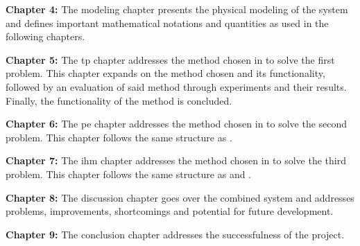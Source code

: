 \textbf{Chapter 4:} The modeling chapter presents the physical modeling of the system and defines important mathematical notations and quantities as used in the following chapters. \medskip

\textbf{Chapter 5:} The \gls{tp} chapter addresses the method chosen in  to solve the first problem. This chapter expands on the method chosen and its functionality, followed by an evaluation of said method through experiments and their results. Finally, the functionality of the method is concluded. \medskip

\textbf{Chapter 6:} The \gls{pe} chapter addresses the method chosen in  to solve the second problem. This chapter follows the same structure as . \medskip

\textbf{Chapter 7:} The \gls{ihm} chapter addresses the method chosen in  to solve the third problem. This chapter follows the same structure as  and . \medskip

\textbf{Chapter 8:} The discussion chapter goes over the combined system and addresses problems, improvements, shortcomings and potential for future development.

\textbf{Chapter 9:} The conclusion chapter addresses the successfulness of the project.


